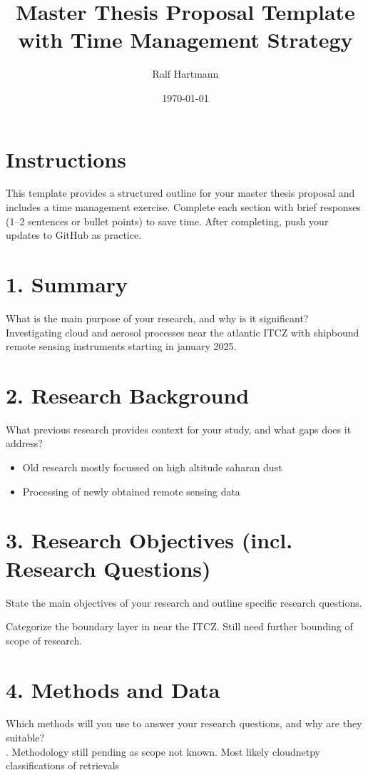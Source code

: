 \documentclass[a4paper,12pt]{article}
\title{Master Thesis Proposal Template with Time Management Strategy}
\author{Ralf Hartmann}
\date{\today}
\begin{document}
\maketitle

\section*{Instructions}
This template provides a structured outline for your master thesis proposal and includes a time management exercise. Complete each section with brief responses (1–2 sentences or bullet points) to save time. After completing, push your updates to GitHub as practice.

\section{1. Summary}
What is the main purpose of your research, and why is it significant?\\

Investigating cloud and aerosol processes near the atlantic ITCZ with shipbound remote sensing instruments starting in january 2025.

\section{2. Research Background}
What previous research provides context for your study, and what gaps does it address?\\
\begin{itemize}
    \item Old research mostly focussed on high altitude saharan dust
    \item Processing of newly obtained remote sensing data
\end{itemize}


\section{3. Research Objectives (incl. Research Questions)}
State the main objectives of your research and outline specific research questions.

Categorize the boundary layer in near the ITCZ. Still need further bounding of scope of research.  

\section{4. Methods and Data}
Which methods will you use to answer your research questions, and why are they suitable?\\
.
Methodology still pending as scope not known. Most likely cloudnetpy classifications of retrievals
\end{document}
